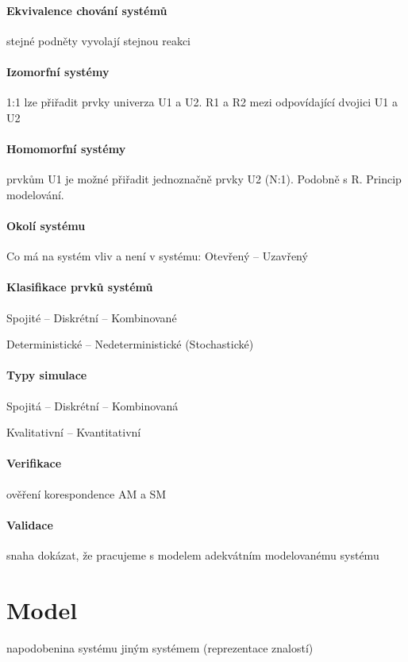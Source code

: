 \documentclass[a4paper, 11pt]{report}
\begin{document}
\paragraph{Ekvivalence chování systémů} stejné podněty vyvolají stejnou reakci

\paragraph{Izomorfní systémy} 1:1 lze přiřadit prvky univerza U1 a U2. R1 a R2 mezi odpovídající dvojici U1 a U2

\paragraph{Homomorfní systémy} prvkům U1 je možné přiřadit jednoznačně prvky U2 (N:1). Podobně s R. Princip modelování.

\paragraph{Okolí systému} Co má na systém vliv a není v systému: Otevřený -- Uzavřený

\paragraph{Klasifikace prvků systémů} Spojité -- Diskrétní -- Kombinované

Deterministické -- Nedeterministické (Stochastické)

\paragraph{Typy simulace} Spojitá -- Diskrétní -- Kombinovaná

Kvalitativní -- Kvantitativní

\paragraph{Verifikace} ověření korespondence AM a SM

\paragraph{Validace} snaha dokázat, že pracujeme s modelem adekvátním modelovanému systému



\section{Model}
napodobenina systému jiným systémem (reprezentace znalostí)
\end{document}
